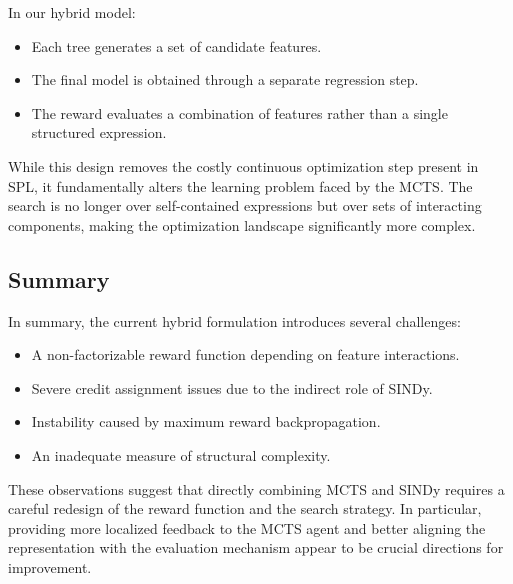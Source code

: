 \documentclass[11pt,a4paper]{article}
\begin{document}
In our hybrid model:
\begin{itemize}
    \item Each tree generates a set of candidate features.
    \item The final model is obtained through a separate regression step.
    \item The reward evaluates a combination of features rather than a single structured expression.
\end{itemize}

While this design removes the costly continuous optimization step present in SPL, it fundamentally alters the learning problem faced by the MCTS. The search is no longer over self-contained expressions but over sets of interacting components, making the optimization landscape significantly more complex.

\subsection{Summary}

In summary, the current hybrid formulation introduces several challenges:
\begin{itemize}
    \item A non-factorizable reward function depending on feature interactions.
    \item Severe credit assignment issues due to the indirect role of SINDy.
    \item Instability caused by maximum reward backpropagation.
    \item An inadequate measure of structural complexity.
\end{itemize}

These observations suggest that directly combining MCTS and SINDy requires a careful redesign of the reward function and the search strategy. In particular, providing more localized feedback to the MCTS agent and better aligning the representation with the evaluation mechanism appear to be crucial directions for improvement.
\end{document}
